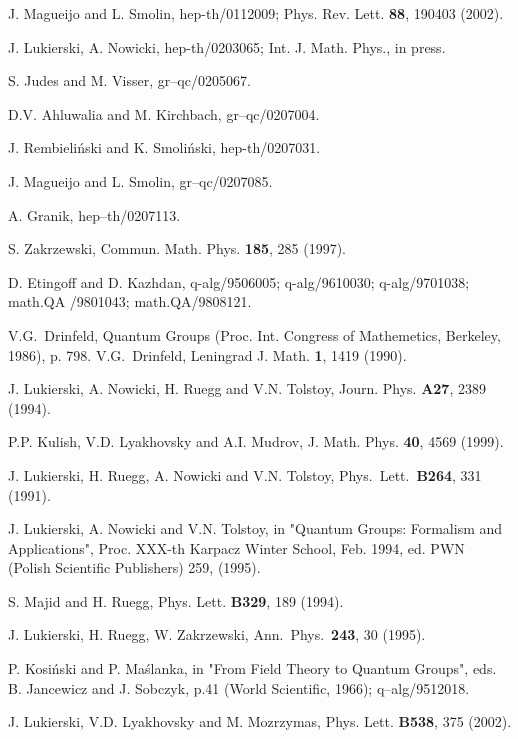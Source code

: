 \documentclass[a4paper,a4paper]{article}
\begin{document}
\begin{thebibliography}{99}


 J. Magueijo and L. Smolin, hep-th/0112009; Phys. 
Rev.
Lett. {\bf 88}, 190403 (2002).

 J. Lukierski, A. Nowicki, hep-th/0203065; Int. J.
Math. Phys., in press.

 S. Judes and M. Visser, gr--qc/0205067.

 D.V. Ahluwalia and M. Kirchbach,
 gr--qc/0207004.

 J. Rembieli\'{n}ski and K. Smoli\'{n}ski,
hep-th/0207031.

 J. Magueijo and L. Smolin, gr--qc/0207085.

 A. Granik, hep--th/0207113.

  S. Zakrzewski, Commun. Math. Phys.  {\bf 185}, 285 
(1997).


 D. Etingoff and D. Kazhdan, q-alg/9506005;
 q-alg/9610030; q-alg/9701038; math.QA /9801043; 
math.QA/9808121.

 V.G.~Drinfeld, Quantum Groups (Proc. Int. Congress
of Mathemetics, Berkeley, 1986), p. 798.
 V.G.~Drinfeld,  Leningrad J. Math. {\bf 1}, 1419 
(1990).

 J. Lukierski, A. Nowicki, H. Ruegg and V.N.
Tolstoy, Journ. Phys. {\bf A27}, 2389 (1994).

 P.P. Kulish, V.D. Lyakhovsky and A.I. Mudrov, J.
Math. Phys. {\bf 40}, 4569 (1999).


 J. Lukierski, H. Ruegg, A. Nowicki and V.N. Tolstoy,
Phys.~Lett.~{\bf B264}, 331 (1991).

 J. Lukierski, A. Nowicki and V.N. Tolstoy,
in "Quantum Groups: Formalism and Applications", Proc. XXX-th
Karpacz Winter School, Feb. 1994, ed. PWN (Polish Scientific
Publishers) 259,  (1995).

  S. Majid and H. Ruegg, Phys. Lett. {\bf B329}, 189 
(1994).


  J. Lukierski, H. Ruegg, W. Zakrzewski,
Ann.~Phys.~{\bf 243}, 30 (1995).

 P. Kosi\'{n}ski and P. Ma\'{s}lanka, in "From Field
Theory to Quantum Groups", eds. B. Jancewicz and J. Sobczyk, 
p.41
(World Scientific, 1966); q--alg/9512018.

 J. Lukierski, V.D. Lyakhovsky and M. Mozrzymas,
Phys. Lett. {\bf B538}, 375 (2002).


\end{thebibliography}
\end{document}
